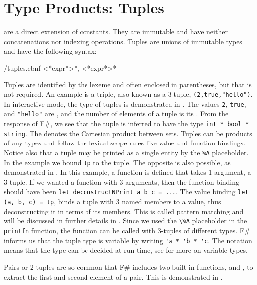 \documentclass[fsharpNotes.tex]{subfiles}
\begin{document}
\section{Type Products: Tuples}
 are a direct extension of constants. They are immutable and have neither concatenations nor indexing operations. Tuples are unions of immutable types and have the following syntax:
%
\begin{verbatimwrite}{\ebnf/tuples.ebnf}
<*expr*>{*, <*expr*>*}
\end{verbatimwrite}
%
Tuples are identified by the \lexeme{,} lexeme and often enclosed in parentheses, but that is not required. An example is a triple, also known as a 3-tuple, \lstinline!(2,true,"hello")!. In interactive mode, the type of tuples is demonstrated in .
%
%
The values \lstinline!2!, \lstinline!true!, and \lstinline!"hello"! are , and the number of elements of a tuple is its . From the response of F\#, we see that the tuple is inferred to have the type \lstinline!int * bool * string!. The \lexeme{*} denotes the Cartesian product between sets.  Tuples can be products of any types and follow the lexical scope rules like value and function bindings. Notice also that a tuple may be printed as a single entity by the \lstinline!%A! %
placeholder. In the example we bound \lstinline!tp! to the tuple. The opposite is also possible, as demonstrated in .
%
%
In this example, a function is defined that takes 1 argument, a 3-tuple. If we wanted a function with 3 arguments, then the function binding should have been \lstinline{let deconstructNPrint a b c = ...}. The value binding \lstinline{let (a, b, c) = tp}, binds a tuple with 3 named members to a value, thus deconstructing it in terms of its members. This is called pattern matching and will be discussed in further details in . Since we used the \lstinline!\%A! placeholder in the \lstinline!printfn! function, the function can be called with 3-tuples of different types. F\# informs us that the tuple type is variable by writing \lstinline{'a * 'b * 'c}. The  notation means that the type can be decided at run-time, see  for more on variable types. 

Pairs or 2-tuples are so common that F\# includes two built-in functions, and , to extract the first and second element of a pair. This is demonstrated in .
%
%
\end{document}
